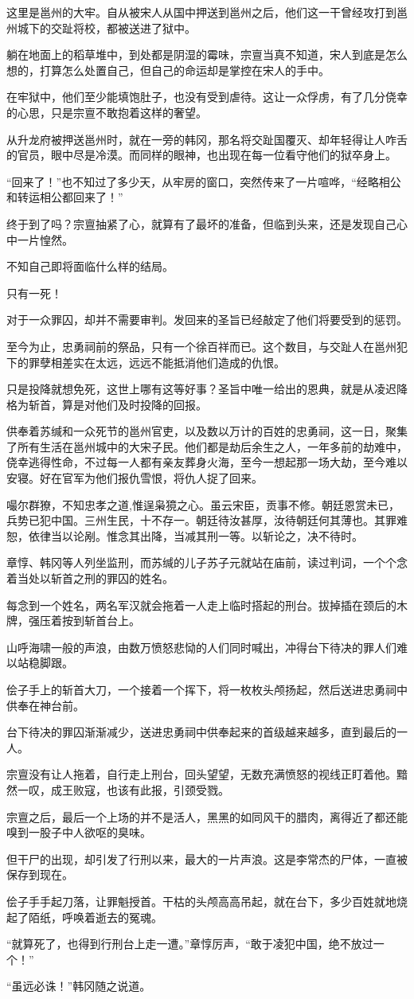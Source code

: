 这里是邕州的大牢。自从被宋人从国中押送到邕州之后，他们这一干曾经攻打到邕州城下的交趾将校，都被送进了狱中。

躺在地面上的稻草堆中，到处都是阴湿的霉味，宗亶当真不知道，宋人到底是怎么想的，打算怎么处置自己，但自己的命运却是掌控在宋人的手中。

在牢狱中，他们至少能填饱肚子，也没有受到虐待。这让一众俘虏，有了几分侥幸的心思，只是宗亶不敢抱着这样的奢望。

从升龙府被押送邕州时，就在一旁的韩冈，那名将交趾国覆灭、却年轻得让人咋舌的官员，眼中尽是冷漠。而同样的眼神，也出现在每一位看守他们的狱卒身上。

“回来了！”也不知过了多少天，从牢房的窗口，突然传来了一片喧哗，“经略相公和转运相公都回来了！”

终于到了吗？宗亶抽紧了心，就算有了最坏的准备，但临到头来，还是发现自己心中一片惶然。

不知自己即将面临什么样的结局。

只有一死！

对于一众罪囚，却并不需要审判。发回来的圣旨已经敲定了他们将要受到的惩罚。

至今为止，忠勇祠前的祭品，只有一个徐百祥而已。这个数目，与交趾人在邕州犯下的罪孽相差实在太远，远远不能抵消他们造成的仇恨。

只是投降就想免死，这世上哪有这等好事？圣旨中唯一给出的恩典，就是从凌迟降格为斩首，算是对他们及时投降的回报。

供奉着苏缄和一众死节的邕州官吏，以及数以万计的百姓的忠勇祠，这一日，聚集了所有生活在邕州城中的大宋子民。他们都是劫后余生之人，一年多前的劫难中，侥幸逃得性命，不过每一人都有亲友葬身火海，至今一想起那一场大劫，至今难以安寝。好在官军为他们报仇雪恨，将仇人捉了回来。

嘬尔群獠，不知忠孝之道,惟逞枭獍之心。虽云宋臣，贡事不修。朝廷恩赏未已，兵势已犯中国。三州生民，十不存一。朝廷待汝甚厚，汝待朝廷何其薄也。其罪难恕，依律当以论剐。惟念其出降，当减其刑一等。以斩论之，决不待时。

章惇、韩冈等人列坐监刑，而苏缄的儿子苏子元就站在庙前，读过判词，一个个念着当处以斩首之刑的罪囚的姓名。

每念到一个姓名，两名军汉就会拖着一人走上临时搭起的刑台。拔掉插在颈后的木牌，强压着按到斩首台上。

山呼海啸一般的声浪，由数万愤怒悲恸的人们同时喊出，冲得台下待决的罪人们难以站稳脚跟。

侩子手上的斩首大刀，一个接着一个挥下，将一枚枚头颅扬起，然后送进忠勇祠中供奉在神台前。

台下待决的罪囚渐渐减少，送进忠勇祠中供奉起来的首级越来越多，直到最后的一人。

宗亶没有让人拖着，自行走上刑台，回头望望，无数充满愤怒的视线正盯着他。黯然一叹，成王败寇，也该有此报，引颈受戮。

宗亶之后，最后一个上场的并不是活人，黑黑的如同风干的腊肉，离得近了都还能嗅到一股子中人欲呕的臭味。

但干尸的出现，却引发了行刑以来，最大的一片声浪。这是李常杰的尸体，一直被保存到现在。

侩子手手起刀落，让罪魁授首。干枯的头颅高高吊起，就在台下，多少百姓就地烧起了陌纸，呼唤着逝去的冤魂。

“就算死了，也得到行刑台上走一遭。”章惇厉声，“敢于凌犯中国，绝不放过一个！”

“虽远必诛！”韩冈随之说道。

